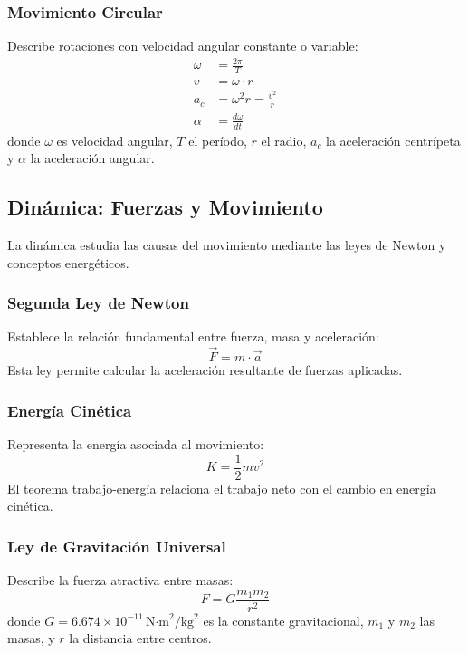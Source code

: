 \subsubsection{Movimiento Circular}
Describe rotaciones con velocidad angular constante o variable:
\begin{align}
\omega &= \frac{2\pi}{T} \\
v &= \omega \cdot r \\
a_c &= \omega^2 r = \frac{v^2}{r} \\
\alpha &= \frac{d\omega}{dt}
\end{align}
donde $\omega$ es velocidad angular, $T$ el período, $r$ el radio, $a_c$ la aceleración centrípeta y $\alpha$ la aceleración angular.

\subsection{Dinámica: Fuerzas y Movimiento}

La dinámica estudia las causas del movimiento mediante las leyes de Newton y conceptos energéticos.

\subsubsection{Segunda Ley de Newton}
Establece la relación fundamental entre fuerza, masa y aceleración:
\begin{equation}
\vec{F} = m \cdot \vec{a}
\end{equation}
Esta ley permite calcular la aceleración resultante de fuerzas aplicadas.

\subsubsection{Energía Cinética}
Representa la energía asociada al movimiento:
\begin{equation}
K = \frac{1}{2} m v^2
\end{equation}
El teorema trabajo-energía relaciona el trabajo neto con el cambio en energía cinética.

\subsubsection{Ley de Gravitación Universal}
Describe la fuerza atractiva entre masas:
\begin{equation}
F = G \frac{m_1 m_2}{r^2}
\end{equation}
donde $G = 6.674 \times 10^{-11} \, \text{N·m}^2/\text{kg}^2$ es la constante gravitacional, $m_1$ y $m_2$ las masas, y $r$ la distancia entre centros.

